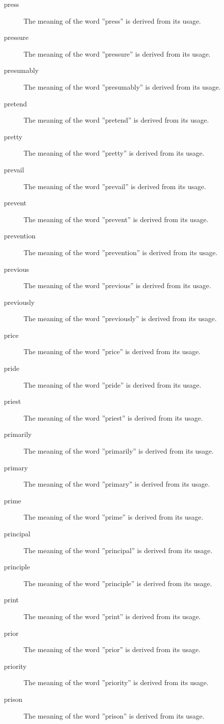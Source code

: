 \documentclass[12pt, letterpaper]{memoir}
\begin{document}
\begin{description}
\item[press] The meaning of the word ''press'' is derived from its usage.
\item[pressure] The meaning of the word ''pressure'' is derived from its usage.
\item[presumably] The meaning of the word ''presumably'' is derived from its usage.
\item[pretend] The meaning of the word ''pretend'' is derived from its usage.
\item[pretty] The meaning of the word ''pretty'' is derived from its usage.
\item[prevail] The meaning of the word ''prevail'' is derived from its usage.
\item[prevent] The meaning of the word ''prevent'' is derived from its usage.
\item[prevention] The meaning of the word ''prevention'' is derived from its usage.
\item[previous] The meaning of the word ''previous'' is derived from its usage.
\item[previously] The meaning of the word ''previously'' is derived from its usage.
\item[price] The meaning of the word ''price'' is derived from its usage.
\item[pride] The meaning of the word ''pride'' is derived from its usage.
\item[priest] The meaning of the word ''priest'' is derived from its usage.
\item[primarily] The meaning of the word ''primarily'' is derived from its usage.
\item[primary] The meaning of the word ''primary'' is derived from its usage.
\item[prime] The meaning of the word ''prime'' is derived from its usage.
\item[principal] The meaning of the word ''principal'' is derived from its usage.
\item[principle] The meaning of the word ''principle'' is derived from its usage.
\item[print] The meaning of the word ''print'' is derived from its usage.
\item[prior] The meaning of the word ''prior'' is derived from its usage.
\item[priority] The meaning of the word ''priority'' is derived from its usage.
\item[prison] The meaning of the word ''prison'' is derived from its usage.

\end{description}
\end{document}
